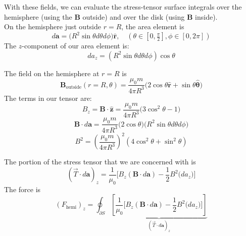 \documentclass[a4paper,12pt]{article} %
\begin{document}
With these fields, we can evaluate the stress-tensor surface integrals over the hemisphere (using the $\mathbf{B}$ outside) and over the disk (using $\mathbf{B}$ inside).\\

On the hemisphere just outside $r=R$, the area element is
$$d\mathbf{a}=\big(R^2\sin\theta d\theta d\phi\big)\hat{\mathbf{r}},\quad(\theta \in [0,\tfrac{\pi}{2}],\phi \in [0,2\pi])
$$
The $z$-component of our area element is:
$$
d a_z=(R^2\sin\theta d\theta d\phi)\cos\theta
$$

The field on the hemisphere at $r=R$ is 
$$
\mathbf{B}_{\text{outside}}(r=R,\theta)=\frac{\mu_0m}{4\pi R^3}\Big(2\cos\theta\hat{\mathbf{r}}+\sin\theta \hat{\boldsymbol{\theta}}\Big)
$$
The terms in our tensor are:
$$
\boxed{B_z =\mathbf{B}\cdot \hat{\mathbf{z}}=\frac{\mu_0m}{4\pi R^3}\big(3\cos^2\theta -1\big)}
$$
$$
\boxed{\mathbf{B}\cdot d\mathbf{a}=\frac{\mu_0m}{4\pi R^3}
\big(2\cos\theta\big)\big(R^2\sin\theta d\theta d\phi\big)}
$$
$$
\boxed{B^2=\left(\frac{\mu_0m}{4\pi R^3}\right)^2\left(4\cos^2\theta + \sin^2\theta\right)}
$$

The portion of the stress tensor that we are concerned with is 
$$
(\overrightarrow{T} \cdot d\mathbf{a})_z=\frac{1}{\mu_0}\Big[B_z(\mathbf{B}\cdot d\mathbf{a})-\frac12 B^2 \big(d a_z\big)
\Big]
$$
The force is
$$
(F_{\text{hemi}})_z=\oint_{\partial S} \underbrace{\left[\frac{1}{\mu_0}\Big[B_z(\mathbf{B}\cdot d\mathbf{a})-\frac12 B^2 \big(d a_z\big)
\Big]\right]}_{(\overrightarrow{T} \cdot d\mathbf{a})_z}
$$
\end{document}
